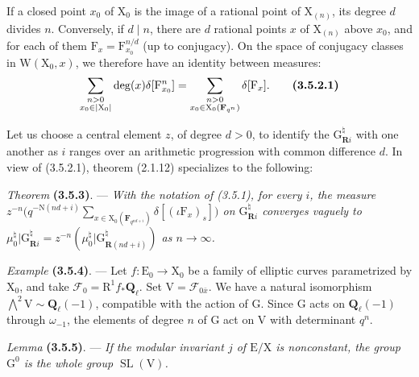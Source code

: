 \documentclass[11pt,leqno]{article}
\begin{document}
If a closed point \(x_0\) of \(\mathrm X_0\) is the image of a rational point of \(\mathrm X_{(n)}\), its degree \(d\) divides \(n\). Conversely, if \(d\mid n\), there are \(d\) rational points \(x\) of \(\mathrm X_{(n)}\) above \(x_0\), and for each of them \(\mathrm F_x=\mathrm F_{x_0}^{n/d}\) (up to conjugacy). On the space of conjugacy classes in \(\mathrm W(\mathrm X_0,x)\), we therefore have an identity between measures:
\[
\sum_{\substack{n>0\\x_0\in|\mathrm X_0|}}
\deg(x)\delta[\mathrm F_{x_0}^{n}]
=
\sum_{\substack{n>0\\x_0\in\mathrm X_0(\mathbf F_{q^n})}}
\delta[\mathrm F_x].
\tag*{\textbf{(3.5.2.1)}}
\]

Let us choose a central element \(z\), of degree \(d>0\), to identify the \(\mathrm G_{\mathbf R i}^{\natural}\) with one another as \(i\) ranges over an arithmetic progression with common difference \(d\). In view of (3.5.2.1), theorem (2.1.12) specializes to the following:

\textit{Theorem} \textbf{(3.5.3)}. — \textit{With the notation of (3.5.1), for every \(i\), the measure \(\displaystyle z^{-n}\bigl(q^{-\mathrm N(nd+i)}\sum_{x\in\mathrm X_0(\mathbf F_{q^{nd+i}})}\delta[(\iota\mathrm F_x)_s]\bigr)\) on \(\mathrm G_{\mathbf R i}^{\natural}\) converges vaguely to \(\mu_0^{\natural}\vert\mathrm G_{\mathbf R i}^{\natural}=z^{-n}(\mu_0^{\natural}\vert\mathrm G_{\mathbf R(nd+i)}^{\natural})\) as \(n\to\infty\).}

\textit{Example} \textbf{(3.5.4)}. — Let \(f:\mathrm E_0\to\mathrm X_0\) be a family of elliptic curves parametrized by \(\mathrm X_0\), and take \(\mathscr F_0=\mathrm R^1f_*\mathbf Q_\ell\). Set \(\mathrm V=\mathscr F_{0\bar x}\). We have a natural isomorphism \(\bigwedge\limits^{2}\mathrm V\sim\mathbf Q_\ell(-1)\), compatible with the action of \(\mathrm G\). Since \(\mathrm G\) acts on \(\mathbf Q_\ell(-1)\) through \(\omega_{-1}\), the elements of degree \(n\) of \(\mathrm G\) act on \(\mathrm V\) with determinant \(q^n\).

\textit{Lemma} \textbf{(3.5.5)}. — \textit{If the modular invariant \(j\) of \(\mathrm E/\mathrm X\) is nonconstant, the group \(\mathrm G^0\) is the whole group \(\operatorname{SL}(\mathrm V)\).}
\end{document}
